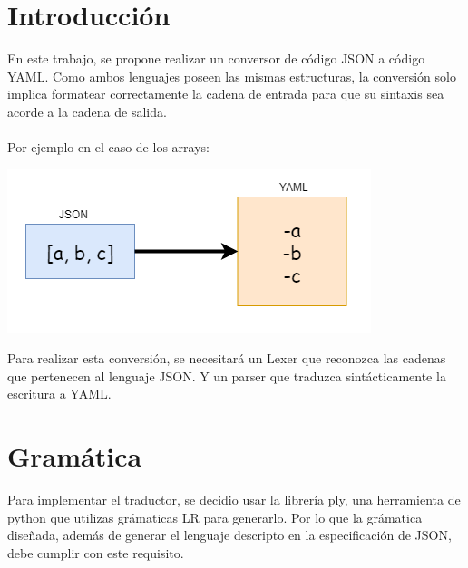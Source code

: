 \documentclass{article}
\begin{document}
\thispagestyle{empty}


\maketitle

\newpage

\tableofcontents
\newpage

\section{Introducción}

En este trabajo, se propone realizar un conversor de código JSON a código YAML. Como ambos lenguajes poseen las mismas estructuras, la conversión solo implica formatear correctamente la cadena de entrada para que su sintaxis sea acorde a la cadena de salida. \\ \\
Por ejemplo en el caso de los arrays: \\

\begin{center}
\includegraphics[scale=0.7]{img1.png}
\end{center}

Para realizar esta conversión, se necesitará un Lexer que reconozca las cadenas que pertenecen al lenguaje JSON. Y un parser que traduzca sintácticamente la escritura a YAML.

\section{Gramática}
Para implementar el traductor, se decidio usar la librería ply, una herramienta de python que utilizas grámaticas LR para generarlo. Por lo que la grámatica diseñada, además de generar el lenguaje descripto en la especificación de JSON, debe cumplir con este requisito.
\end{document}
